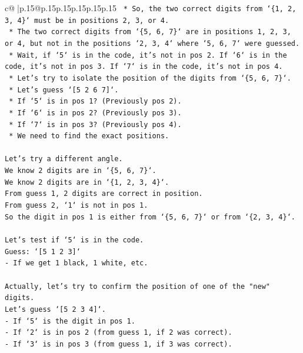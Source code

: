 \documentclass{article}
\begin{document}
{\begin{supertabular}{c@{$\;$}|p{.15\linewidth}@{}p{.15\linewidth}p{.15\linewidth}p{.15\linewidth}p{.15\linewidth}p{.15\linewidth}}
{{{\texttt{    *   So, the two correct digits from `\{1, 2, 3, 4\}` must be in positions 2, 3, or 4.} \\
\texttt{    *   The two correct digits from `\{5, 6, 7\}` are in positions 1, 2, 3, or 4, but not in the positions `2, 3, 4` where `5, 6, 7` were guessed.} \\
\texttt{    *   Wait, if `5` is in the code, it's not in pos 2. If `6` is in the code, it's not in pos 3. If `7` is in the code, it's not in pos 4.} \\
\texttt{    *   Let's try to isolate the position of the digits from `\{5, 6, 7\}`.} \\
\texttt{    *   Let's guess `{[}5 2 6 7{]}`.} \\
\texttt{        *   If `5` is in pos 1? (Previously pos 2).} \\
\texttt{        *   If `6` is in pos 2? (Previously pos 3).} \\
\texttt{        *   If `7` is in pos 3? (Previously pos 4).} \\
\texttt{        *   We need to find the exact positions.} \\
\\ 
\texttt{Let's try a different angle.} \\
\texttt{We know 2 digits are in `\{5, 6, 7\}`.} \\
\texttt{We know 2 digits are in `\{1, 2, 3, 4\}`.} \\
\texttt{From guess 1, 2 digits are correct in position.} \\
\texttt{From guess 2, `1` is not in pos 1.} \\
\texttt{So the digit in pos 1 is either from `\{5, 6, 7\}` or from `\{2, 3, 4\}`.} \\
\\ 
\texttt{Let's test if `5` is in the code.} \\
\texttt{Guess: `{[}5 1 2 3{]}`} \\
\texttt{{-} If we get 1 black, 1 white, etc.} \\
\\ 
\texttt{Actually, let's try to confirm the position of one of the "new" digits.} \\
\texttt{Let's guess `{[}5 2 3 4{]}`.} \\
\texttt{{-} If `5` is the digit in pos 1.} \\
\texttt{{-} If `2` is in pos 2 (from guess 1, if 2 was correct).} \\
\texttt{{-} If `3` is in pos 3 (from guess 1, if 3 was correct).} \\
}}}
\end{supertabular}}
\end{document}
